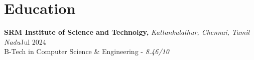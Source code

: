 \documentclass[11pt]{article}       %
\begin{document}

\vspace{-18.5pt}

\section*{Education}
\textbf{SRM Institute of Science and Technolgy,} \textit{Kattankulathur, Chennai, Tamil Nadu}\hfill Jul 2024 \\
B-Tech in Computer Science {\&} Engineering - \textit{8.46/10}
\end{document}
